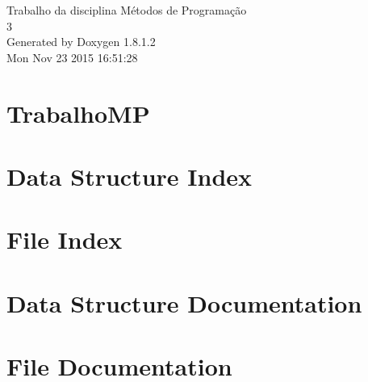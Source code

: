 \documentclass{book}
\begin{document}
\hypersetup{pageanchor=false,citecolor=blue}
\begin{titlepage}
\vspace*{7cm}
\begin{center}
{\Large Trabalho da disciplina Métodos de Programação \\[1ex]\large 3 }\\
\vspace*{1cm}
{\large Generated by Doxygen 1.8.1.2}\\
\vspace*{0.5cm}
{\small Mon Nov 23 2015 16:51:28}\\
\end{center}
\end{titlepage}
\clearemptydoublepage
{}
\tableofcontents
\clearemptydoublepage
{}
\hypersetup{pageanchor=true,citecolor=blue}
\chapter{Trabalho\-M\-P}
\label{md_README}
\hypertarget{md_README}{}

\chapter{Data Structure Index}

\chapter{File Index}

\chapter{Data Structure Documentation}





\chapter{File Documentation}


















\printindex
\end{document}
